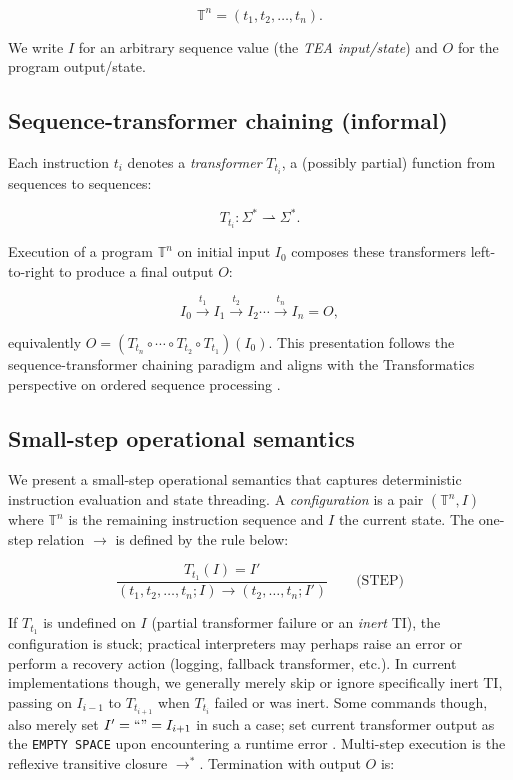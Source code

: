 \documentclass[sigplan,screen]{acmart}
\begin{document}
\[
\mathbb{T}^n = (t_1, t_2, \dots, t_n).
\]


We write \(I\) for an arbitrary sequence value (the \emph{TEA input/state}) and \(O\) for the program output/state.

\subsection{Sequence-transformer chaining (informal)}
Each instruction \(t_i\) denotes a \emph{transformer} \(T_{t_i}\), a (possibly partial) function from sequences to sequences:


\[
T_{t_i} : \Sigma^* \rightharpoonup \Sigma^*.
\]


Execution of a program \(\mathbb{T}^n\) on initial input \(I_0\) composes these transformers left-to-right to produce a final output \(O\):


\[
I_0 \xrightarrow{t_1} I_1 \xrightarrow{t_2} I_2 \cdots \xrightarrow{t_n} I_{n} = O,
\]


equivalently \(O = (T_{t_n}\circ \cdots \circ T_{t_2}\circ T_{t_1})(I_0)\).  This presentation follows the sequence-transformer chaining paradigm and aligns with the Transformatics perspective on ordered sequence processing \cite{Lutalo2025_transformatics_thesis}.

\subsection{Small-step operational semantics}
We present a small-step operational semantics that captures deterministic instruction evaluation and state threading.  A \emph{configuration} is a pair \((\mathbb{T}^n, I)\) where \(\mathbb{T}^n\) is the remaining instruction sequence and \(I\) the current state.  The one-step relation \(\longrightarrow\) is defined by the rule below:



\[
\frac{T_{t_1}(I) = I'}{(t_1, t_2, \dots, t_n; I) \longrightarrow (t_2, \dots, t_n; I')}
\qquad\text{(STEP)}
\]



If \(T_{t_1}\) is undefined on \(I\) (partial transformer failure or an \textit{inert} TI), the configuration is stuck; practical interpreters may perhaps raise an error or perform a recovery action (logging, fallback transformer, etc.). In current implementations though, we generally merely skip or ignore specifically inert TI, passing on $I_{i-1}$ to $T_{t_{i+1}}$ when $T_{t_{i}}$ failed or was inert. Some commands though, also merely set $I' = ``" = I_{i+1}$ in such a case; set current transformer output as the \texttt{EMPTY SPACE} upon encountering a runtime error \cite{Lutalo2024TEATAZ}.  Multi-step execution is the reflexive transitive closure \(\longrightarrow^{*}\).  Termination with output \(O\) is:
\end{document}
